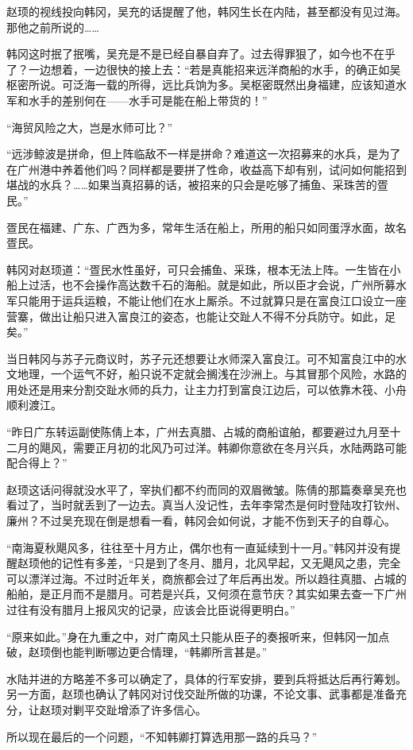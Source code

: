 赵顼的视线投向韩冈，吴充的话提醒了他，韩冈生长在内陆，甚至都没有见过海。那他之前所说的……

韩冈这时抿了抿嘴，吴充是不是已经自暴自弃了。过去得罪狠了，如今也不在乎了？一边想着，一边很快的接上去：“若是真能招来远洋商船的水手，的确正如吴枢密所说。可泛海一载的所得，远比兵饷为多。吴枢密既然出身福建，应该知道水军和水手的差别何在——水手可是能在船上带货的！”

“海贸风险之大，岂是水师可比？”

“远涉鲸波是拼命，但上阵临敌不一样是拼命？难道这一次招募来的水兵，是为了在广州港中养着他们吗？同样都是要拼了性命，收益高下却有别，试问如何能招到堪战的水兵？……如果当真招募的话，被招来的只会是吃够了捕鱼、采珠苦的疍民。”

疍民在福建、广东、广西为多，常年生活在船上，所用的船只如同蛋浮水面，故名疍民。

韩冈对赵顼道：“疍民水性虽好，可只会捕鱼、采珠，根本无法上阵。一生皆在小船上过活，也不会操作高达数千石的海船。就是如此，所以臣才会说，广州所募水军只能用于运兵运粮，不能让他们在水上厮杀。不过就算只是在富良江口设立一座营寨，做出让船只进入富良江的姿态，也能让交趾人不得不分兵防守。如此，足矣。”

当日韩冈与苏子元商议时，苏子元还想要让水师深入富良江。可不知富良江中的水文地理，一个运气不好，船只说不定就会搁浅在沙洲上。与其冒那个风险，水路的用处还是用来分割交趾水师的兵力，让主力打到富良江边后，可以依靠木筏、小舟顺利渡江。

“昨日广东转运副使陈倩上本，广州去真腊、占城的商船谊舶，都要避过九月至十二月的飓风，需要正月初的北风乃可过洋。韩卿你意欲在冬月兴兵，水陆两路可能配合得上？”

赵顼这话问得就没水平了，宰执们都不约而同的双眉微皱。陈倩的那篇奏章吴充也看过了，当时就丢到了一边去。真当人没记性，去年李常杰是何时登陆攻打钦州、廉州？不过吴充现在倒是想看一看，韩冈会如何说，才能不伤到天子的自尊心。

“南海夏秋飓风多，往往至十月方止，偶尔也有一直延续到十一月。”韩冈并没有提醒赵顼他的记性有多差，“只是到了冬月、腊月，北风早起，又无飓风之患，完全可以漂洋过海。不过时近年关，商旅都会过了年后再出发。所以趋往真腊、占城的船舶，是正月而不是腊月。可若是兴兵，又何须在意节庆？其实如果去查一下广州过往有没有腊月上报风灾的记录，应该会比臣说得更明白。”

“原来如此。”身在九重之中，对广南风土只能从臣子的奏报听来，但韩冈一加点破，赵顼倒也能判断哪边更合情理，“韩卿所言甚是。”

水陆并进的方略差不多可以确定了，具体的行军安排，要到兵将抵达后再行筹划。另一方面，赵顼也确认了韩冈对讨伐交趾所做的功课，不论文事、武事都是准备充分，让赵顼对剿平交趾增添了许多信心。

所以现在最后的一个问题，“不知韩卿打算选用那一路的兵马？”


